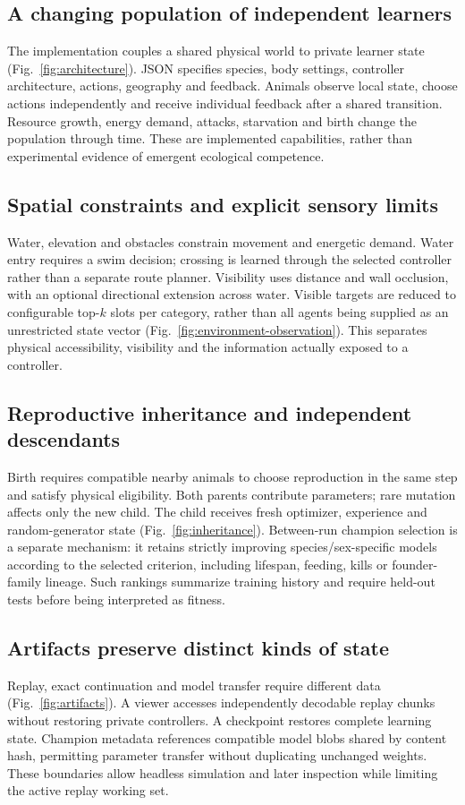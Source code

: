 \subsection{A changing population of independent learners}
The implementation couples a shared physical world to private learner state
(Fig.~\ref{fig:architecture}). JSON specifies species, body settings, controller
architecture, actions, geography and feedback. Animals observe local state,
choose actions independently and receive individual feedback after a shared
transition. Resource growth, energy demand, attacks, starvation and birth change
the population through time. These are implemented capabilities, rather than
experimental evidence of emergent ecological competence.


\subsection{Spatial constraints and explicit sensory limits}
Water, elevation and obstacles constrain movement and energetic demand. Water
entry requires a swim decision; crossing is learned through the selected
controller rather than a separate route planner. Visibility uses distance and
wall occlusion, with an optional directional extension across water. Visible
targets are reduced to configurable top-$k$ slots per category, rather than all
agents being supplied as an unrestricted state vector
(Fig.~\ref{fig:environment-observation}). This separates physical accessibility,
visibility and the information actually exposed to a controller.


\subsection{Reproductive inheritance and independent descendants}
Birth requires compatible nearby animals to choose reproduction in the same
step and satisfy physical eligibility. Both parents contribute parameters;
rare mutation affects only the new child. The child receives fresh optimizer,
experience and random-generator state (Fig.~\ref{fig:inheritance}). Between-run
champion selection is a separate mechanism: it retains strictly improving
species/sex-specific models according to the selected criterion, including
lifespan, feeding, kills or founder-family lineage. Such rankings summarize
training history and require held-out tests before being interpreted as fitness.


\subsection{Artifacts preserve distinct kinds of state}
Replay, exact continuation and model transfer require different data
(Fig.~\ref{fig:artifacts}). A viewer accesses independently decodable replay
chunks without restoring private controllers. A checkpoint restores complete
learning state. Champion metadata references compatible model blobs shared by
content hash, permitting parameter transfer without duplicating unchanged
weights. These boundaries allow headless simulation and later inspection while
limiting the active replay working set.

